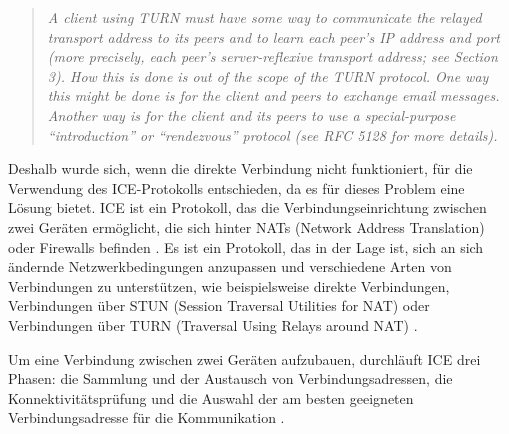 \begin{quote}
    \textit{A client using TURN must have some way to communicate the relayed transport address to its
    peers and to learn each peer's IP address and port (more precisely, each peer's server-reflexive
    transport address; see Section 3). How this is done is out of the scope of the TURN protocol. One
    way this might be done is for the client and peers to exchange email messages. Another way is
    for the client and its peers to use a special-purpose \enquote{introduction} or \enquote{rendezvous} protocol (see RFC 5128
    for more details).} \parencite[S. 7]{rfc8656_TURN}
\end{quote}


\noindent Deshalb wurde sich, wenn die direkte Verbindung nicht funktioniert, für die Verwendung des ICE-Protokolls entschieden, da es für dieses Problem eine Lösung bietet.
ICE ist ein Protokoll, das die Verbindungseinrichtung zwischen zwei Geräten ermöglicht, die sich hinter NATs (Network Address Translation) oder Firewalls befinden \parencite[S. 6 ff.]{rfc8445_ICE}. Es ist ein Protokoll, das in der Lage ist, sich an sich ändernde Netzwerkbedingungen anzupassen und verschiedene Arten von Verbindungen zu unterstützen, wie beispielsweise direkte Verbindungen, Verbindungen über STUN (Session Traversal Utilities for NAT) oder Verbindungen über TURN (Traversal Using Relays around NAT) \parencite[S. 1]{rfc8445_ICE}. 

Um eine Verbindung zwischen zwei Geräten aufzubauen, durchläuft ICE drei Phasen: die Sammlung und der Austausch von Verbindungsadressen, die Konnektivitätsprüfung und die Auswahl der am besten geeigneten Verbindungsadresse für die Kommunikation \parencite[S. 7 ff.]{rfc8445_ICE}.

